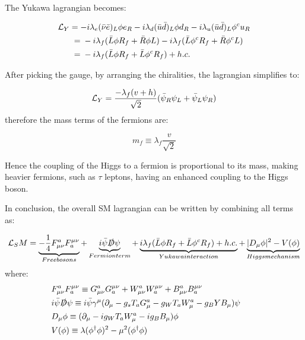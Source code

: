 The Yukawa lagrangian becomes:

\begin{align}
    \MoveEqLeft[3]
    \Lagr_Y = -i\lambda_e (\Bar{\nu}\Bar{e})_L \phi e_R - i\lambda_d (\Bar{u}\Bar{d})_L \phi d_R - i\lambda_u (\Bar{u}\Bar{d})_L \phi^c u_R \\ ={}& -i\lambda_f (\Bar{L}\phi R_f + \Bar{R}\phi L) - i\lambda_f(\Bar{L}\phi^c R_f + \Bar{R}\phi^c L) \\ ={}& -i\lambda_f(\Bar{L}\phi R_f + \Bar{L}\phi^cR_f) + h.c.
\end{align}

After picking the gauge, by arranging the chiralities, the lagrangian simplifies to:

\begin{equation}
    \mathcal{L}_Y = \frac{-\lambda_f (v+h)}{\sqrt{2}}(\Bar{\psi}_R\psi_L + \Bar{\psi}_L\psi_R)
\end{equation}
therefore the mass terms of the fermions are:

\begin{equation}
    m_f \equiv \lambda_f \frac{v}{\sqrt{2}}
\end{equation}

Hence the coupling of the Higgs to a fermion is proportional to its mass, making heavier fermions, such as $\tau$ leptons, having an enhanced coupling to the Higgs boson.

In conclusion, the overall SM lagrangian can be written by combining all terms as:

\begin{equation}
    \mathcal{L}_SM = \underbrace{- \frac{1}{4} F_{\mu\nu}^a F^{\mu\nu}_a}_{Free bosons} + \underbrace{i\Bar{\psi}\slashed{D}\psi}_{Fermion term} +\underbrace{i\lambda_f(\Bar{L}\phi R_f + \Bar{L}\phi^cR_f) + h.c.}_{Yukawa interaction} + \underbrace{|D_{\mu}\phi|^2 - V(\phi)}_{Higgs mechanism}
\end{equation}
where:
\begin{align*}
    & F_{\mu\nu}^a F^{\mu\nu}_a \equiv G_{\mu\nu}^a G^{\mu\nu}_a + W_{\mu\nu}^a W^{\mu\nu}_a + B_{\mu\nu}^a B^{\mu\nu}_a \\
    & i\Bar{\psi}\slashed{D}\psi \equiv i\Bar{\psi}\gamma^{\mu} (\partial_{\mu} - g_s T_a G_{\mu}^a - g_W T_a W^{a}_{\mu} - g_B Y B_{\mu})  \psi \\
    & D_{\mu}\phi \equiv (\partial_{\mu} - ig_W T_a W_{\mu}^{a} - ig_B B_{\mu})\phi \\
    & V(\phi) \equiv \lambda(\phi^{\dagger}\phi)^2 - \mu^2 (\phi^{\dagger}\phi) &&
\end{align*}

